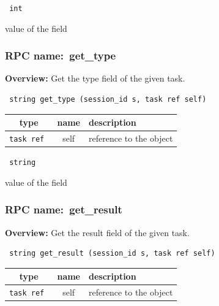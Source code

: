 \vspace{0.3cm}

{\tt 
int
}


value of the field
\vspace{0.3cm}
\vspace{0.3cm}
\vspace{0.3cm}
\subsubsection{RPC name:~get\_type}

{\bf Overview:} 
Get the type field of the given task.

\begin{verbatim} string get_type (session_id s, task ref self)\end{verbatim}



 
\vspace{0.3cm}
\begin{tabular}{|c|c|p{7cm}|}
 \hline
{\bf type} & {\bf name} & {\bf description} \\ \hline
{\tt task ref } & self & reference to the object \\ \hline 

\end{tabular}

\vspace{0.3cm}

{\tt 
string
}


value of the field
\vspace{0.3cm}
\vspace{0.3cm}
\vspace{0.3cm}
\subsubsection{RPC name:~get\_result}

{\bf Overview:} 
Get the result field of the given task.

\begin{verbatim} string get_result (session_id s, task ref self)\end{verbatim}



 
\vspace{0.3cm}
\begin{tabular}{|c|c|p{7cm}|}
 \hline
{\bf type} & {\bf name} & {\bf description} \\ \hline
{\tt task ref } & self & reference to the object \\ \hline 

\end{tabular}

